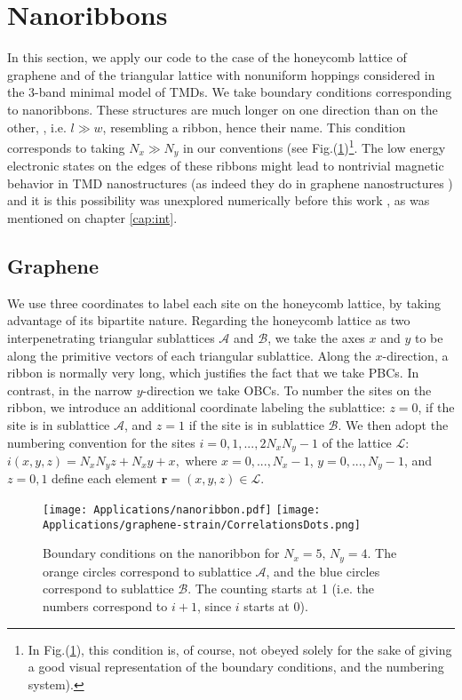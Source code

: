 \section{Nanoribbons}
\label{sec:nanoribbon}

In this section, we apply our code to the case of the honeycomb lattice of graphene and of the triangular lattice with nonuniform hoppings considered in the 3-band minimal model of \acs{TMD}s.
We take boundary conditions corresponding to nanoribbons.
These structures are much longer on one direction than on the other, , i.e. $l \gg w$, resembling a ribbon, hence their name.
This condition corresponds to taking $N_x \gg N_y$ in our conventions (see Fig.(\ref{fig:bcRibbon})\footnote{In Fig.(\ref{fig:bcRibbon}), this condition is, of course, not obeyed solely for the sake of giving a good visual representation of the boundary conditions, and the numbering system).}.
The low energy electronic states on the edges of these ribbons might lead to nontrivial magnetic behavior in \ac{TMD} nanostructures (as indeed they do in graphene nanostructures \cite{yazyev_emergence_2010}) and it is this possibility was unexplored numerically before this work \cite{feldner_dynamical_2011, golor_quantum_2013}, as was mentioned on chapter \ref{cap:int}.

\subsection{Graphene}
\label{sec:graphene}

We use three coordinates to label each site on the honeycomb lattice, by taking advantage of its bipartite nature.
Regarding the honeycomb lattice as two interpenetrating triangular sublattices $\mathcal{A}$ and $\mathcal{B}$, we take the axes $x$ and $y$ to be along the primitive vectors of each triangular sublattice.
Along the $x$-direction, a ribbon is normally very long, which justifies the fact that we take \acp{PBC}.
In contrast, in the narrow $y$-direction we take \acp{OBC}.
To number the sites on the ribbon, we introduce an additional coordinate labeling the sublattice: $z = 0$, if the site is in sublattice $\mathcal{A}$, and $z = 1$ if the site is in sublattice $\mathcal{B}$.
We then adopt the numbering convention for the sites $i = 0,1, ..., 2 N_x N_y - 1$ of the lattice $\mathcal{L}$:
$
i (x, y, z) = N_x N_y z + N_x y + x,
$
 where $x = 0, ..., N_x - 1$, $y = 0, ..., N_y - 1$, and $z = 0, 1$ define each element $\bm r = (x, y, z) \in \mathcal{L}$.

\begin{figure}[H]
\hspace{-0.4cm}
\texttt{[image: Applications/nanoribbon.pdf]}
\texttt{[image: Applications/graphene-strain/CorrelationsDots.png]}
	\caption[Boundary conditions on the nanoribbon.]{Boundary conditions on the nanoribbon for $N_x = 5, \, N_y = 4$. The orange circles correspond to sublattice $\mathcal{A}$, and the blue circles correspond to sublattice $\mathcal{B}$.
	The counting starts at 1 (i.e. the numbers correspond to $i+1$, since $i$ starts at 0).}
	\label{fig:bcRibbon}
\end{figure}


